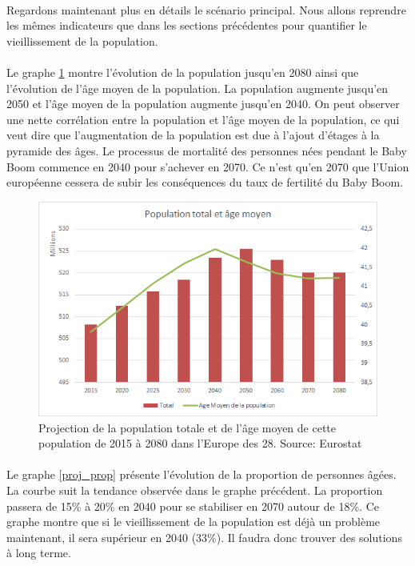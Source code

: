 \paragraph{}Regardons maintenant plus en détails le scénario principal. Nous allons reprendre les mêmes indicateurs que dans les sections précédentes pour quantifier le vieillissement de la population. 

\paragraph{}Le graphe \ref{proj_pop} montre l’évolution de la population jusqu’en 2080 ainsi que l’évolution de l’âge moyen de la population. La population augmente jusqu’en 2050 et l’âge moyen de la population augmente jusqu’en 2040. On peut observer une nette corrélation entre la population et l’âge moyen de la population, ce qui veut dire que l’augmentation de la population est due à l’ajout d’étages à la pyramide des âges. Le processus de mortalité des personnes nées pendant le Baby Boom commence en 2040 pour s’achever en 2070. Ce n’est qu’en 2070 que l’Union européenne cessera de subir les conséquences du taux de fertilité du Baby Boom. 


\begin{figure}[h!]
    \begin{center}
        \includegraphics[scale=0.7]{document/proj_pop.png}
        \caption{Projection de la population totale et de l'âge moyen de cette population de 2015 à 2080 dans l'Europe des 28. Source: Eurostat~\citep{eurostat_europop13}}
        \label{proj_pop}
    \end{center}
\end{figure}

\paragraph{}Le graphe \ref{proj_prop} présente l’évolution de la proportion de personnes âgées. La courbe suit la tendance observée dans le graphe précédent. La proportion passera de 15\% à 20\% en 2040 pour se stabiliser en 2070 autour de 18\%. Ce graphe montre que si le vieillissement de la population est déjà un problème maintenant, il sera supérieur en 2040 (33\%). Il faudra donc trouver des solutions à long terme.

